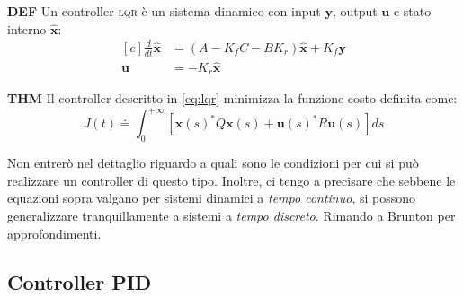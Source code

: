 \begin{framed}
  \textbf{DEF}
  Un controller \textsc{lqr} è un sistema dinamico con input $\mathbf y$, output $\mathbf u$ e stato interno
  $\hat{\mathbf x}$: %
  \begin{equation}
    \begin{aligned}[c]
      \frac d {dt} \hat {\mathbf x} &= (A-K_f C - B K_r) \hat{\mathbf x} + K_f \mathbf y \\ %
      \mathbf u               &= -K_r \hat{\mathbf x}
    \end{aligned}
    \label{eq:lqr}
  \end{equation}
\end{framed}
\begin{framed}
  \textbf{THM}
  Il controller descritto in \eqref{eq:lqr} minimizza la funzione costo definita come:
  \begin{equation}
    J(t) \doteq
      \int_0^{+\infty} \left[ \mathbf{x} (s)^* Q \mathbf {x} (s) + \mathbf {u} (s)^* R \mathbf {u} (s) \right] ds
    \label{eq:lqr-costo}
  \end{equation}
\end{framed}

Non entrerò nel dettaglio riguardo a quali sono le condizioni per cui si può realizzare un controller di questo tipo.
Inoltre, ci tengo a precisare che sebbene le equazioni sopra %
valgano per sistemi dinamici a \emph{tempo continuo}, si possono generalizzare tranquillamente a sistemi
a \emph{tempo discreto}.
Rimando a Brunton%
per approfondimenti.

\subsection{Controller \textsc{PID}}\label{subsec:intro-pid}
